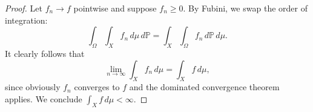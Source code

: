 
\begin{proof}
Let $f_n \to f$ pointwise and suppose $f_n \geq 0$.
By Fubini, we swap the order of integration:
\[
  \int_\Omega \int_X f_n \, d\mu \, d\mathbb{P}
  = \int_X \int_\Omega f_n \, d\mathbb{P} \, d\mu.
\]
It clearly follows that
\[
  \lim_{n \to \infty} \int_X f_n \, d\mu = \int_X f \, d\mu,
\]
since obviously $f_n$ converges to $f$ and the dominated convergence theorem applies.
We conclude $\int_X f \, d\mu < \infty$.
\end{proof}
